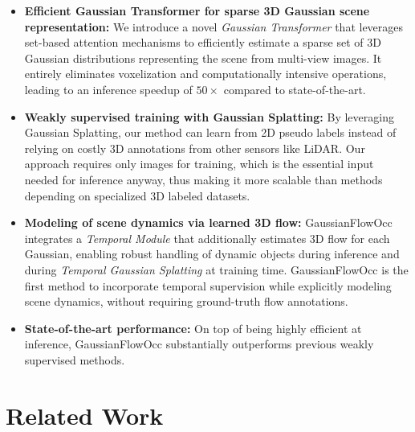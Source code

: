 \documentclass[10pt,twocolumn,letterpaper]{article}
\begin{document}
\begin{itemize}
    \item \textbf{Efficient Gaussian Transformer for sparse 3D Gaussian scene representation:} 
    We introduce a novel \emph{Gaussian Transformer} that leverages set-based attention mechanisms to efficiently estimate a sparse set of 3D Gaussian distributions representing the scene from multi-view images.
    It entirely eliminates voxelization and computationally intensive operations, leading to an inference speedup of $50\times$ compared to state-of-the-art.
    \item \textbf{Weakly supervised training with Gaussian Splatting:}
    By leveraging Gaussian Splatting, our method can learn from 2D pseudo labels instead of relying on costly 3D annotations from other sensors like LiDAR.
    Our approach requires only images for training, which is the essential input needed for inference anyway, thus making it more scalable than methods depending on specialized 3D labeled datasets.
    \item \textbf{Modeling of scene dynamics via learned 3D flow:} GaussianFlowOcc integrates a \emph{Temporal Module} that additionally estimates 3D flow for each Gaussian, enabling robust handling of dynamic objects during inference and during \emph{Temporal Gaussian Splatting} at training time.
    GaussianFlowOcc is the first method to incorporate temporal supervision while explicitly modeling scene dynamics, without requiring ground-truth flow annotations.
    \item \textbf{State-of-the-art performance:} On top of being highly efficient at inference, GaussianFlowOcc substantially outperforms previous weakly supervised methods.
\end{itemize}

\section{Related Work}
\end{document}
